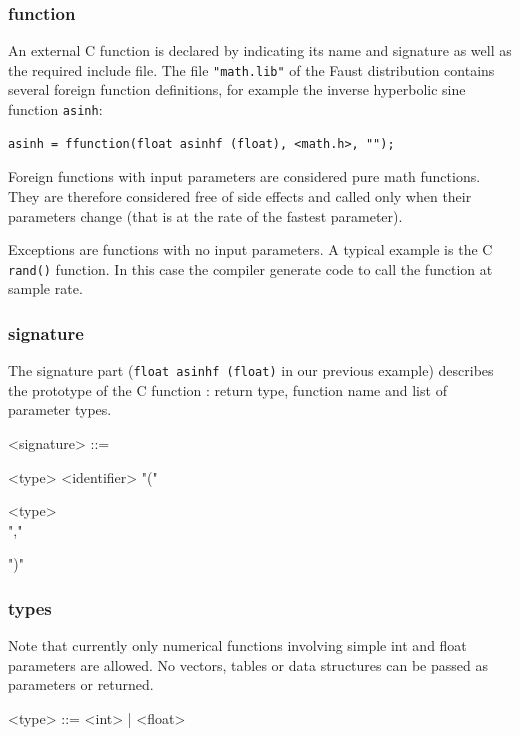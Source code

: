 \documentclass[a4paper]{book}
\begin{document}
\subsubsection{function} An external C function is declared by indicating its name and signature as well as the required include file.
The file \lstinline'"math.lib"' of the Faust distribution contains several foreign function definitions, for example the inverse hyperbolic sine function \lstinline'asinh':

\begin{lstlisting}
asinh = ffunction(float asinhf (float), <math.h>, "");
\end{lstlisting}

Foreign functions with input parameters are considered pure math functions. They are therefore considered free of side effects and called only when their parameters change (that is at the rate of the fastest parameter). 

Exceptions are functions with no input parameters. A typical example is the C \lstinline'rand()' function. In this case the compiler generate code to call the function at sample rate.


\subsubsection{signature} 
The signature part (\lstinline'float asinhf (float)' in our previous example) describes the prototype of the C function : return type, function name and list of parameter types. 

\begin{grammar}
  <signature> ::= 
  \begin{syntdiag}
    <type> <identifier> "("
    \begin{rep}
      <type> \\ ","
    \end{rep}
    ")"
  \end{syntdiag}
\end{grammar}

\subsubsection{types}
Note that currently only numerical functions involving simple int and float parameters are allowed. No vectors, tables or data structures can be passed as parameters or returned.

\begin{grammar}
  <type> ::= 
      <int> | <float>
\end{grammar}
\end{document}
